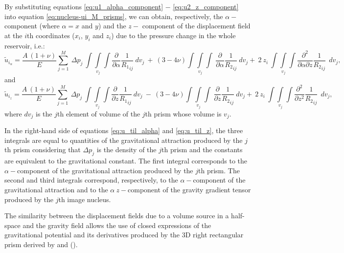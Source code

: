 \documentclass[journal abbreviation, manuscript]{copernicus}
\begin{document}
By substituting equations \ref{eq:u1_alpha_component} $-$ \ref{eq:u2_z_component} into equation \ref{eq:nucleus-ui_M_prisms}, we can obtain, respectively,  the $\alpha-$component (where  $\alpha = x$ and $y$) and the $z-$ component of the displacement field at the $i$th coordinates ($x_i$, $y_i$  and $z_i$) due to the pressure change in the whole reservoir, i.e.:
\begin{equation}
{\tilde{u}}_{{i}_\alpha} = \frac{A  \: (1 + \nu)}{E}  \sum_{j=1}^{M} 
\: \Delta p_{j}  \: \int\int\limits_{v_j}\int 
\frac{\partial }{\partial \alpha} {\frac{1}{{R_1}_{ij}}} \:  dv_j 
\: + \: 
(3  - 4 \nu)  \int\int\limits_{v_j}\int
\: \frac{\partial }{\partial \alpha} {\frac{1}{{R_2}_{ij}}}\:  dv_j
+ \: 2 \: z_{i} \:  \int\int\limits_{v_j}\int
\frac{\partial^{2}  }{\partial \alpha \partial z} {\frac{1}{{R_2}_{ij}}}  \:\:  dv_j, 
\label{eq:u_til_alpha}
\end{equation}
and 
\begin{equation}
{\tilde{u}}_{{i}_z} = \frac{A  \: (1 + \nu)}{E}  \sum_{j=1}^{M} 
\: \Delta p_{j}  \: \int\int\limits_{v_j}\int 
\frac{\partial }{\partial z} {\frac{1}{{R_1}_{ij}}} \:  dv_j 
\: - \: (3  - 4 \nu)  \int\int\limits_{v_j}\int
\: \frac{\partial }{\partial z} {\frac{1}{{R_2}_{ij}}}\:  dv_j
+ \: 2 \: z_{i} \:  \int\int\limits_{v_j}\int
\frac{\partial^{2}  }{\partial z^{2}} {\frac{1}{{R_2}_{ij}}}  \:\:  dv_j, 
\label{eq:u_til_z}
\end{equation}
where $dv_j$ is the $j$th element of volume of the $j$th prism whose volume is $v_j$.


In the right-hand side of equations \ref{eq:u_til_alpha} and \ref{eq:u_til_z}, the three integrals are equal to  quantities of the gravitational attraction produced by the $j$th prism considering that 
$\Delta p_{j}$ is the density of the $j$th prism and the constants are equivalent to the gravitational constant. 
The first integral corresponds to the $\alpha-$component of the gravitational attraction produced by the $j$th prism.
The second and third integrals correspond, respectively, to the $\alpha-$component of the gravitational attraction and to the $\alpha \:z-$component of the gravity gradient tensor produced by the $j$th image nucleus. 

The similarity between the displacement fields due to a volume source in a half-space and the gravity field allows the use of closed expressions of the gravitational potential and its derivatives produced by the 3D right rectangular prism derived by \cite{Nagyetal2000} and (\citeyear{Nagyetal2002}).  
\end{document}
